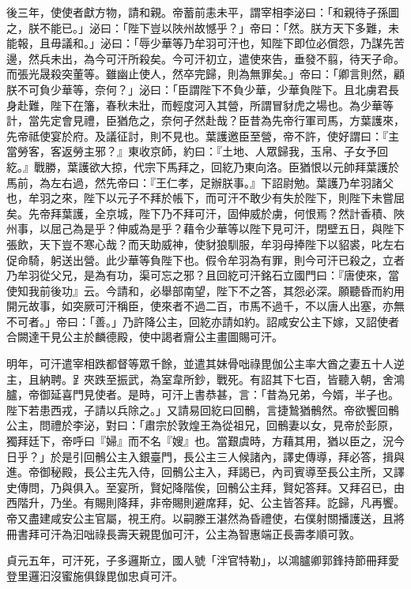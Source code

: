 \begin{pinyinscope}
 後三年，使使者獻方物，請和親。帝蓄前恚未平，謂宰相李泌曰：「和親待子孫圖之，朕不能已。」泌曰：「陛下豈以陜州故憾乎？」帝曰：「然。朕方天下多難，未能報，且毋議和。」泌曰：「辱少華等乃牟羽可汗也，知陛下即位必償怨，乃謀先苦邊，然兵未出，為今可汗所殺矣。今可汗初立，遣使來告，垂發不翦，待天子命。而張光晟殺突董等。雖幽止使人，然卒完歸，則為無罪矣。」帝曰：「卿言則然，顧朕不可負少華等，奈何？」泌曰：「臣謂陛下不負少華，少華負陛下。且北虜君長身赴難，陛下在籓，春秋未壯，而輕度河入其營，所謂冒豺虎之場也。為少華等計，當先定會見禮，臣猶危之，奈何孑然赴哉？臣昔為先帝行軍司馬，方葉護來，先帝祗使宴於府。及議征討，則不見也。葉護邀臣至營，帝不許，使好謂曰：『主當勞客，客返勞主邪？』東收京師，約曰：『土地、人眾歸我，玉帛、子女予回紇。』戰勝，葉護欲大掠，代宗下馬拜之，回紇乃東向洛。臣猶恨以元帥拜葉護於馬前，為左右過，然先帝曰：『王仁孝，足辦朕事。』下詔尉勉。葉護乃牟羽諸父也，牟羽之來，陛下以元子不拜於帳下，而可汗不敢少有失於陛下，則陛下未嘗屈矣。先帝拜葉護，全京城，陛下乃不拜可汗，固伸威於虜，何恨焉？然計香積、陜州事，以屈己為是乎？伸威為是乎？藉令少華等以陛下見可汗，閉壁五日，與陛下張飲，天下豈不寒心哉？而天助威神，使豺狼馴服，牟羽母捧陛下以貂裘，叱左右促命騎，躬送出營。此少華等負陛下也。假令牟羽為有罪，則今可汗已殺之，立者乃牟羽從父兄，是為有功，渠可忘之邪？且回紇可汗銘石立國門曰：『唐使來，當使知我前後功』云。今請和，必舉部南望，陛下不之答，其怨必深。願聽昏而約用開元故事，如突厥可汗稱臣，使來者不過二百，市馬不過千，不以唐人出塞，亦無不可者。」帝曰：「善。」乃許降公主，回紇亦請如約。詔咸安公主下嫁，又詔使者合闕達干見公主於麟德殿，使中謁者齎公主畫圖賜可汗。



 明年，可汗遣宰相跌都督等眾千餘，並遣其妹骨咄祿毘伽公主率大酋之妻五十人逆主，且納聘。𧾷夾跌至振武，為室韋所鈔，戰死。有詔其下七百，皆聽入朝，舍鴻臚，帝御延喜門見使者。是時，可汗上書恭甚，言：「昔為兄弟，今婿，半子也。陛下若患西戎，子請以兵除之。」又請易回紇曰回鶻，言捷鷙猶鶻然。帝欲饗回鶻公主，問禮於李泌，對曰：「肅宗於敦煌王為從祖兄，回鶻妻以女，見帝於彭原，獨拜廷下，帝呼曰『婦』而不名『嫂』也。當艱虞時，方藉其用，猶以臣之，況今日乎？」於是引回鶻公主入銀臺門，長公主三人候諸內，譯史傳導，拜必答，揖與進。帝御秘殿，長公主先入侍，回鶻公主入，拜謁已，內司賓導至長公主所，又譯史傳問，乃與俱入。至宴所，賢妃降階俟，回鶻公主拜，賢妃答拜。又拜召已，由西階升，乃坐。有賜則降拜，非帝賜則避席拜，妃、公主皆答拜。訖歸，凡再饗。帝又盡建咸安公主官屬，視王府。以嗣滕王湛然為昏禮使，右僕射關播護送，且將冊書拜可汗為汩咄祿長壽天親毘伽可汗，公主為智惠端正長壽孝順可敦。



 貞元五年，可汗死，子多邏斯立，國人號「泮官特勒」，以鴻臚卿郭鋒持節冊拜愛登里邏汩沒蜜施俱錄毘伽忠貞可汗。




\end{pinyinscope}

